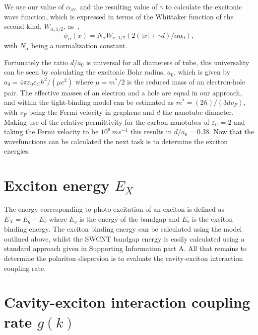 \documentclass[journal=aamick,manuscript=article]{achemso}
\begin{document}
We use our value of $\alpha_{\text{av.}}$ and the resulting value of $\gamma$ to calculate the excitonic wave function, which is expressed in terms of the Whittaker function of the second kind, $W_{\alpha,1/2}$, as~\cite{Loudon1959},
%
\begin{equation}
\label{eq:ExcitonWavefunction}
    \psi_{\alpha}(x) = N_{\alpha} W_{\alpha,1/2}(2(|x|+ \gamma d)/\alpha a_0),
\end{equation}
%
with $N_{\alpha}$ being a normalization constant.

Fortunately the ratio $d/a_0$ is universal for all diameters of tube, this universality can be seen by calculating the excitonic Bohr radius, $a_0$, which is given by $a_0 =  4 \pi \varepsilon_0 \varepsilon_C \hbar^2/(\mu e^2)$ where $\mu=m^{\ast}/2$ is the reduced mass of an electron-hole pair.
The effective masses of an electron and a hole are equal in our approach, and within the tight-binding model can be estimated as $m^{\ast}=(2 \hbar)/(3 d v_F)$, with $v_F$ being the Fermi velocity in graphene and $d$ the nanotube diameter.
Making use of the relative permittivity for the carbon nanotubes of $\varepsilon_C = 2$ and taking the Fermi velocity to be $10^6~ms^{-1}$ this results in $d/a_0 = 0.38$.
Now that the wavefunctions can be calculated the next task is to determine the exciton energies.\\

\section*{Exciton energy $E_X$}
The energy corresponding to photo-excitation of an exciton is defined as $E_X=E_g-E_b$ where $E_g$ is the energy of the bandgap and $E_b$ is the exciton binding energy. The exciton binding energy can be calculated using the model outlined above, whilst the SWCNT bandgap energy is easily calculated using a standard approach given in Supporting Information part A. All that remains to determine the polariton dispersion is to evaluate the cavity-exciton interaction coupling rate.\\

\section*{Cavity-exciton interaction coupling rate $g(k)$} 
\end{document}
